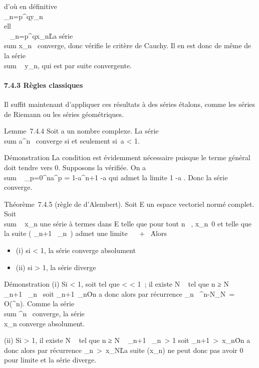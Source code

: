 \documentclass[]{article}
\begin{document}
d'où en définitive \\\sum
 _n=p^qy_n  \over
\\ell\
\\
\sum ~
_n=p^qx_n\. La série
\\sum  x_n~
converge, donc vérifie le critère de Cauchy. Il en est donc de même de
la série \\sum ~
y_n, qui est par suite convergente.

\paragraph{7.4.3 Règles classiques}

Il suffit maintenant d'appliquer ces résultats à des séries étalons,
comme les séries de Riemann ou les séries géométriques.

Lemme~7.4.4 Soit a un nombre complexe. La série
\\sum  a^n~
converge si et seulement si~a \textless{} 1.

Démonstration La condition est évidemment nécessaire puisque le terme
général doit tendre vers 0. Supposons la vérifiée. On a
\\sum ~
_p=0^na^p = 1-a^n+1
-a qui admet la limite  1 \over
1-a . Donc la série converge.

Théorème~7.4.5 (règle de d'Alembert). Soit E un espace vectoriel normé
complet. Soit \\sum ~
x_n une série à termes dans E telle que pour tout n \in {}~,
x_n\neq~0 et telle que la suite (
\x_n+1\
\over
\x_n\ )
admet une limite \ell \in {}~ \cup\ + \infty~\. Alors

\begin{itemize}
\itemsep1pt\parskip0pt
\item
  (i) si \ell \textless{} 1, la série converge absolument
\item
  (ii) si \ell \textgreater{} 1, la série diverge
\end{itemize}

Démonstration (i) Si \ell \textless{} 1, soit \rho tel que \ell \textless{} \rho
\textless{} 1~; il existe N \in {}~ tel que n ≥ N \rigtharrow~
\x_n+1\
\over
\x_n\ \leq \rho
soit \x_n+1\
\leq \rho\x_n\. On
a donc alors par récurrence
\x_n\ \leq
\rho^n-N\x_N\
= O(\rho^n). Comme la série
\\sum  \rho^n~
converge, la série \\\sum
 x_n converge absolument.

(ii) Si \ell \textgreater{} 1, il existe N \in {}~ tel que n ≥ N \rigtharrow~
\x_n+1\
\over
\x_n\
\textgreater{} 1 soit
\x_n+1\
\textgreater{}\
x_n\. On a donc alors par récurrence
\x_n\
\textgreater{}\
x_N\. La suite (x_n) ne peut
donc pas avoir 0 pour limite et la série diverge.
\end{document}
